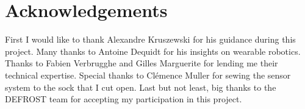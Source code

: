 \chapter{Acknowledgements}
First I would like to thank Alexandre Kruszewski for his guidance during this project.
Many thanks to Antoine Dequidt for his insights on wearable robotics.
Thanks to Fabien Verbrugghe and Gilles Marguerite for lending me their technical expertise.
Special thanks to Clémence Muller for sewing the sensor system to the sock that I cut open.
Last but not least, big thanks to the DEFROST team for accepting my participation 
in this project.

